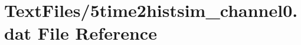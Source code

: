\hypertarget{5time2histsim__channel0_8dat}{}\section{Text\+Files/5time2histsim\+\_\+channel0.dat File Reference}
\label{5time2histsim__channel0_8dat}

